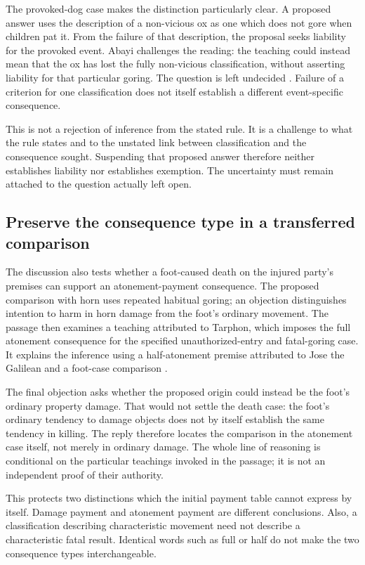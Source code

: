 The provoked-dog case makes the distinction particularly clear.
A proposed answer uses the description of a non-vicious ox as
one which does not gore when children pat it. From the failure
of that description, the proposal seeks liability for the
provoked event. Abayi challenges the reading: the teaching
could instead mean that the ox has lost the fully non-vicious
classification, without asserting liability for that particular
goring. The question is left undecided
\parencite[p.~50]{RodkinsonBabaKamaCopyright1900}.
Failure of a criterion for one classification does not itself
establish a different event-specific consequence.

This is not a rejection of inference from the stated rule.
It is a challenge to what the rule states and to the unstated
link between classification and the consequence sought.
Suspending that proposed answer therefore neither establishes
liability nor establishes exemption. The uncertainty must
remain attached to the question actually left open.

\subsection{Preserve the consequence type in a transferred comparison}
\label{sec:p18-talmudic-consequence-types}

The discussion also tests whether a foot-caused death on the
injured party's premises can support an atonement-payment consequence.
The proposed comparison with horn uses repeated habitual goring;
an objection distinguishes intention to harm in horn damage from
the foot's ordinary movement. The passage then examines a teaching
attributed to Tarphon, which imposes the full atonement consequence
for the specified unauthorized-entry and fatal-goring case.
It explains the inference using a half-atonement premise attributed
to Jose the Galilean and a foot-case comparison
\parencite[pp.~53--54]{RodkinsonBabaKamaCopyright1900}.

The final objection asks whether the proposed origin could instead
be the foot's ordinary property damage. That would not settle the
death case: the foot's ordinary tendency to damage objects does not
by itself establish the same tendency in killing. The reply therefore
locates the comparison in the atonement case itself, not merely in
ordinary damage. The whole line of reasoning is conditional on the
particular teachings invoked in the passage; it is not an independent
proof of their authority.

This protects two distinctions which the initial payment table
cannot express by itself. Damage payment and atonement payment
are different conclusions. Also, a classification describing
characteristic movement need not describe a characteristic
fatal result. Identical words such as full or half do not make
the two consequence types interchangeable.

